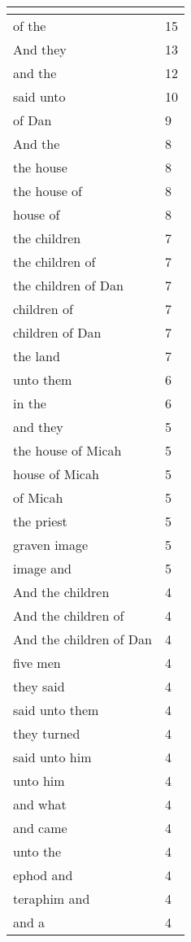 \begin{center}
\begin{longtable}{|p{3.0in}|p{0.5in}|}
\hline \multicolumn{2}{c}{{ }} \\ \hline
\endfoot 
of the & 15\\ \hline 
And they & 13\\ \hline 
and the & 12\\ \hline 
said unto & 10\\ \hline 
of Dan & 9\\ \hline 
And the & 8\\ \hline 
the house & 8\\ \hline 
the house of & 8\\ \hline 
house of & 8\\ \hline 
the children & 7\\ \hline 
the children of & 7\\ \hline 
the children of Dan & 7\\ \hline 
children of & 7\\ \hline 
children of Dan & 7\\ \hline 
the land & 7\\ \hline 
unto them & 6\\ \hline 
in the & 6\\ \hline 
and they & 5\\ \hline 
the house of Micah & 5\\ \hline 
house of Micah & 5\\ \hline 
of Micah & 5\\ \hline 
the priest & 5\\ \hline 
graven image & 5\\ \hline 
image and & 5\\ \hline 
And the children & 4\\ \hline 
And the children of & 4\\ \hline 
And the children of Dan & 4\\ \hline 
five men & 4\\ \hline 
they said & 4\\ \hline 
said unto them & 4\\ \hline 
they turned & 4\\ \hline 
said unto him & 4\\ \hline 
unto him & 4\\ \hline 
and what & 4\\ \hline 
and came & 4\\ \hline 
unto the & 4\\ \hline 
ephod and & 4\\ \hline 
teraphim and & 4\\ \hline 
and a & 4\\ \hline 

\end{longtable}
\end{center}
